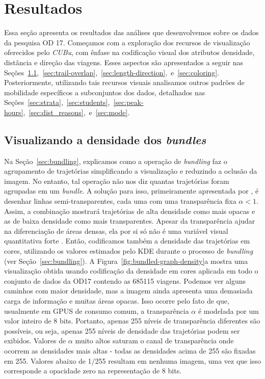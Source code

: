 \chapter{Resultados}
\label{sec:results}

Essa seção apresenta os resultados das análises que desenvolvemos sobre os dados
da pesquisa OD 17. Começamos com a exploração dos recursos de visualização
oferecidos pelo \emph{CUBu}, com ênfase na codificação visual dos atributos
densidade, distância e direção das viagens. Esses aspectos são apresentados a
seguir nas
Seções~\ref{sec:density},~\ref{sec:trail-overlap},~\ref{sec:length-direction},~e~\ref{sec:coloring}.
Posteriormente, utilizando tais recursos visuais analisamos outros padrões de
mobilidade específicos a subconjuntos dos dados, detalhados nas
Seções~\ref{sec:strata},~\ref{sec:students},~\ref{sec:peak-hours},~\ref{sec:dist_reasons},~e~\ref{sec:mode}.

\section{Visualizando a densidade dos \emph{bundles}}
\label{sec:density}

Na Seção~\ref{sec:bundling}, explicamos como a operação de \emph{bundling}
faz o agrupamento de trajetórias simplificando a visualização e reduzindo a oclusão
da imagem. No entanto, tal operação não nos diz quantas trajetórias foram agrupadas em
um \emph{bundle}. A solução para isso, primeiramente apresentada por \citet{holten06},
é desenhar linhas semi-transparentes, cada uma com uma transparência fixa $\alpha < 1$.
Assim, a combinação mostrará trajetórias de alta densidade como mais opacas e as de baixa
densidade como mais transparentes. Apesar da transparência ajudar na diferenciação
de áreas densas, ela por si só não é uma variável visual quantitativa forte \citep{slocum09}.
Então, codificamos também a densidade das trajetórias em cores, utilizando
os valores estimados pelo KDE durante o processo de \emph{bundling} (ver Seção~\ref{sec:bundling}).
A Figura~\ref{fig:bundled-graph-density}a mostra uma visualização obtida usando codificação
da densidade em cores aplicada em todo o conjunto de dados da OD17 contendo
as \num{685115} viagens. Podemos ver alguns caminhos com maior densidade, mas a imagem
ainda apresenta uma demasiada carga de informação e muitas áreas opacas. Isso ocorre pelo fato de que,
usualmente em GPUS de consumo comum, a transparência $\alpha$ é modelada por um valor
inteiro de 8 bits. Portanto, apenas 255 níveis de transparência diferentes são possíveis,
ou seja, apenas 255 níveis de densidade das trajetórias podem ser exibidos. Valores
de $\alpha$ muito altos saturam o canal de transparência
onde ocorrem as densidades mais altas - todas as densidades acima de 255 são fixadas
em 255. Valores abaixo de 1/255 resultam em nenhuma imagem, uma vez que
isso corresponde a opacidade zero na representação de 8 bits.

